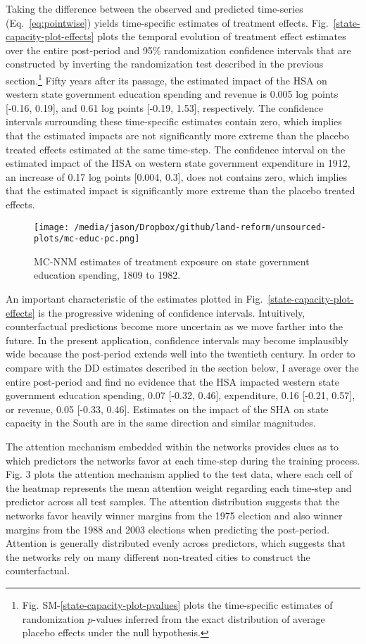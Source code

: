 \documentclass[hidelinks,12pt]{article}
\begin{document}
Taking the difference between the observed and predicted time-series (Eq.~\ref{eq:pointwise}) yields time-specific estimates of treatment effects. Fig.~\ref{state-capacity-plot-effects} plots the temporal evolution of treatment effect estimates over the entire post-period and 95\% randomization confidence intervals that are constructed by inverting the randomization test described in the previous section.\footnote{Fig. SM-\ref{state-capacity-plot-pvalues} plots the time-specific estimates of randomization $p$-values inferred from the exact distribution of average placebo effects under the null hypothesis.} Fifty years after its passage, the estimated impact of the HSA on western state government education spending and revenue is 0.005 log points [-0.16, 0.19], and 0.61 log points [-0.19, 1.53], respectively. The confidence intervals surrounding these time-specific estimates contain zero, which implies that the estimated impacts are not significantly more extreme than the placebo treated effects estimated at the same time-step. The confidence interval on the estimated impact of the HSA on western state government expenditure in 1912, an increase of 0.17 log points [0.004, 0.3], does not contains zero, which implies that the estimated impact is significantly more extreme than the placebo treated effects. 

\begin{figure}[htbp]
	\centering
	\texttt{[image: /media/jason/Dropbox/github/land-reform/unsourced-plots/mc-educ-pc.png]}
	\caption{MC-NNM estimates of treatment exposure on state government education spending, 1809 to 1982.\label{mc-educ-pc}} 
\end{figure}

An important characteristic of the estimates plotted in Fig.~\ref{state-capacity-plot-effects} is the progressive widening of confidence intervals. Intuitively, counterfactual predictions become more uncertain as we move farther into the future. In the present application, confidence intervals may become implausibly wide because the post-period extends well into the twentieth century. In order to compare with the DD estimates described in the section below, I average over the entire post-period and find no evidence that the HSA impacted western state government education spending, 0.07 [-0.32, 0.46], expenditure, 0.16 [-0.21, 0.57], or revenue, 0.05 [-0.33, 0.46]. Estimates on the impact of the SHA on state capacity in the South are in the same direction and similar magnitudes. 

The attention mechanism embedded within the networks provides clues as to which predictors the networks favor at each time-step during the training process. Fig. 3 plots the attention mechanism applied to the test data, where each cell of the heatmap represents the mean attention weight regarding each time-step and predictor across all test samples. The attention distribution suggests that the networks favor heavily winner margins from the 1975 election and also winner margins from the 1988 and 2003 elections when predicting the post-period. Attention is generally distributed evenly across predictors, which suggests that the networks rely on many different non-treated cities to construct the counterfactual.
\end{document}

